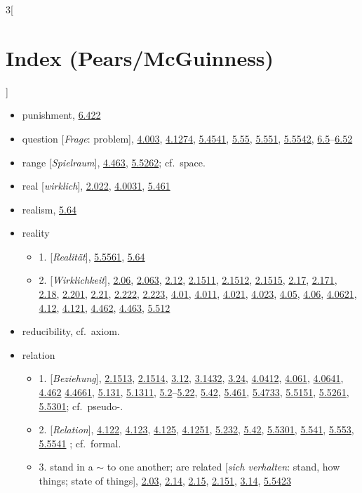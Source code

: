 \documentclass[oneside,openany,12pt]{book}
\newcommand{\indexentry}[1]{\item #1}
\newcommand{\indexsubentry}[1]{\begin{itemize} \item #1 \end{itemize}}
\newcommand{\indexref}[1]{\hyperlink{prop#1}{#1}}
\newcommand{\indexgap}{\bigskip}
\begin{document}
\begin{multicols}{3}[\section*{Index (Pears/McGuinness)}]
\begin{itemize}
\indexentry{punishment, \indexref{6.422}}

\indexgap

\indexentry{question [\textit{Frage}: problem], \indexref{4.003}, \indexref{4.1274}, \indexref{5.4541}, \indexref{5.55}, \indexref{5.551}, \indexref{5.5542}, \indexref{6.5}--\indexref{6.52}}

\indexgap

\indexentry{range [\textit{Spielraum}], \indexref{4.463}, \indexref{5.5262}; cf.\ space.}

\indexentry{real [\textit{wirklich}], \indexref{2.022}, \indexref{4.0031}, \indexref{5.461}}

\indexentry{realism, \indexref{5.64}}

\indexentry{reality}

   \indexsubentry{1. [\textit{Realit{\"a}t}], \indexref{5.5561}, \indexref{5.64}}

   \indexsubentry{2. [\textit{Wirklichkeit}], \indexref{2.06}, \indexref{2.063}, \indexref{2.12}, \indexref{2.1511}, \indexref{2.1512}, \indexref{2.1515}, \indexref{2.17}, \indexref{2.171}, \indexref{2.18}, \indexref{2.201}, \indexref{2.21}, \indexref{2.222}, \indexref{2.223}, \indexref{4.01}, \indexref{4.011}, \indexref{4.021}, \indexref{4.023}, \indexref{4.05}, \indexref{4.06}, \indexref{4.0621}, \indexref{4.12}, \indexref{4.121}, \indexref{4.462}, \indexref{4.463}, \indexref{5.512}}

\indexentry{reducibility, cf.\ axiom.}

\indexentry{relation}

   \indexsubentry{1. [\textit{Beziehung}], \indexref{2.1513}, \indexref{2.1514}, \indexref{3.12}, \indexref{3.1432}, \indexref{3.24}, \indexref{4.0412}, \indexref{4.061}, \indexref{4.0641}, \indexref{4.462} \indexref{4.4661}, \indexref{5.131}, \indexref{5.1311}, \indexref{5.2}--\indexref{5.22}, \indexref{5.42}, \indexref{5.461}, \indexref{5.4733}, \indexref{5.5151}, \indexref{5.5261}, \indexref{5.5301}; cf.\ pseudo-.}

   \indexsubentry{2. [\textit{Relation}], \indexref{4.122}, \indexref{4.123}, \indexref{4.125}, \indexref{4.1251}, \indexref{5.232}, \indexref{5.42}, \indexref{5.5301}, \indexref{5.541}, \indexref{5.553}, \indexref{5.5541} ; cf.\ formal.}

   \indexsubentry{3. stand in a $\sim$ to one another; are related [\textit{sich verhalten}: stand, how things; state of things], \indexref{2.03}, \indexref{2.14}, \indexref{2.15}, \indexref{2.151}, \indexref{3.14}, \indexref{5.5423}}


\end{itemize}
\end{multicols}
\end{document}
